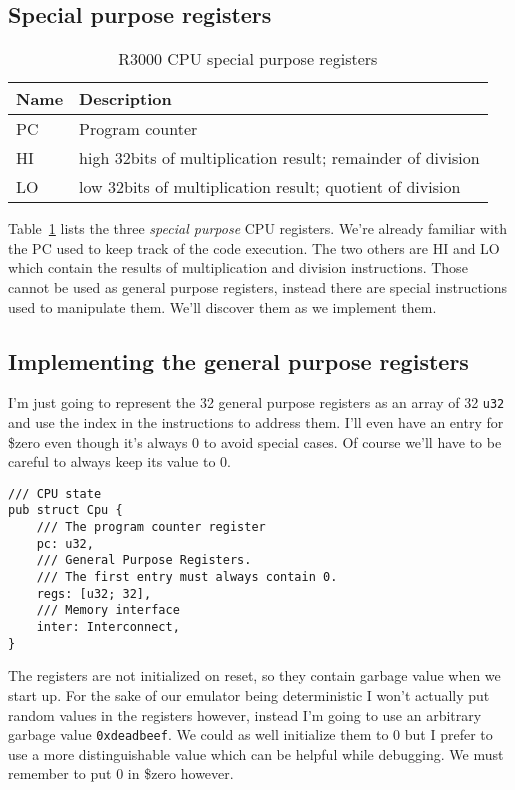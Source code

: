 \documentclass[a4paper]{article}
\newcommand{\code}[1] {\texttt{#1}}
\begin{document}
\subsection{Special purpose registers}

\begin{table}[ht]
  \centering

  \begin{tabular}{ l | l }
    Name        & Description     \\
    \hline
    PC          & Program counter \\
    HI          & high 32bits of multiplication result; remainder of
                  division \\
    LO          & low 32bits of multiplication result; quotient of
                  division \\
  \end{tabular}

  \caption{R3000 CPU special purpose registers}
  \label{tab:specialcpuregs}
\end{table}

Table~\ref{tab:specialcpuregs} lists the three \emph{special purpose}
CPU registers. We're already familiar with the PC used to keep track
of the code execution. The two others are HI and LO which contain the
results of multiplication and division instructions. Those cannot be
used as general purpose registers, instead there are special
instructions used to manipulate them. We'll discover them as we
implement them.

\subsection{Implementing the general purpose registers}

I'm just going to represent the 32 general purpose registers as an
array of 32 \code{u32} and use the index in the instructions to
address them. I'll even have an entry for \$zero even though it's
always 0 to avoid special cases. Of course we'll have
to be careful to always keep its value to 0.

\begin{lstlisting}
/// CPU state
pub struct Cpu {
    /// The program counter register
    pc: u32,
    /// General Purpose Registers.
    /// The first entry must always contain 0.
    regs: [u32; 32],
    /// Memory interface
    inter: Interconnect,
}
\end{lstlisting}

The registers are not initialized on reset, so they contain garbage
value when we start up. For the sake of our emulator being
deterministic I won't actually put random values in the registers
however, instead I'm going to use an arbitrary garbage value
\code{0xdeadbeef}. We could as well initialize them to 0 but I
prefer to use a more distinguishable value which can be helpful while
debugging. We must remember to put 0 in \$zero however.
\end{document}
